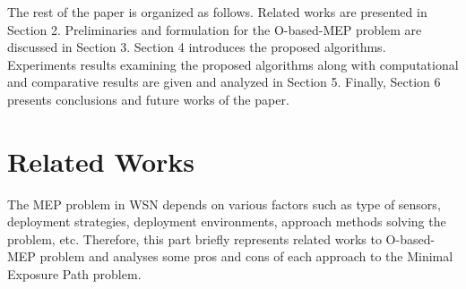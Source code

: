 \documentclass[final]{elsarticle}
\begin{document}
The rest of the paper is organized as follows. Related works are presented in Section 2. Preliminaries and formulation for the O-based-MEP problem are discussed in Section 3. Section 4 introduces the proposed algorithms. Experiments results examining the proposed algorithms along with computational and comparative results are given and analyzed in Section 5. Finally, Section 6 presents conclusions and future works of the paper.

\section{Related Works}
The MEP problem in WSN depends on various factors such as type of sensors, deployment strategies, deployment environments, approach methods solving the problem, etc. Therefore, this part briefly represents related works to O-based-MEP problem and analyses some pros and cons of each approach to the Minimal Exposure Path problem.
\end{document}
